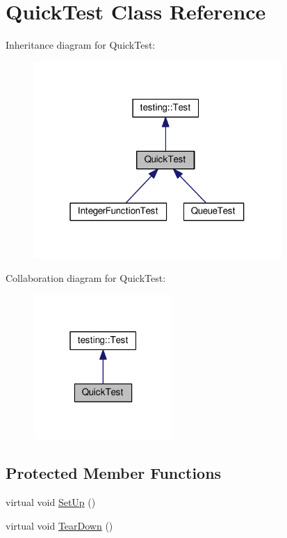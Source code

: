 \hypertarget{classQuickTest}{}\section{Quick\+Test Class Reference}
\label{classQuickTest}


Inheritance diagram for Quick\+Test\+:\nopagebreak
\begin{figure}[H]
\begin{center}
\leavevmode
\includegraphics[width=268pt]{classQuickTest__inherit__graph}
\end{center}
\end{figure}


Collaboration diagram for Quick\+Test\+:\nopagebreak
\begin{figure}[H]
\begin{center}
\leavevmode
\includegraphics[width=151pt]{classQuickTest__coll__graph}
\end{center}
\end{figure}
\subsection*{Protected Member Functions}
\begin{DoxyCompactItemize}
\item 
virtual void \hyperlink{classQuickTest_ae52ad082887512b92240ce40a1a05650}{Set\+Up} ()
\item 
virtual void \hyperlink{classQuickTest_a6b2d16cc0c69d30a16fe612db5abfc39}{Tear\+Down} ()
\end{DoxyCompactItemize}
